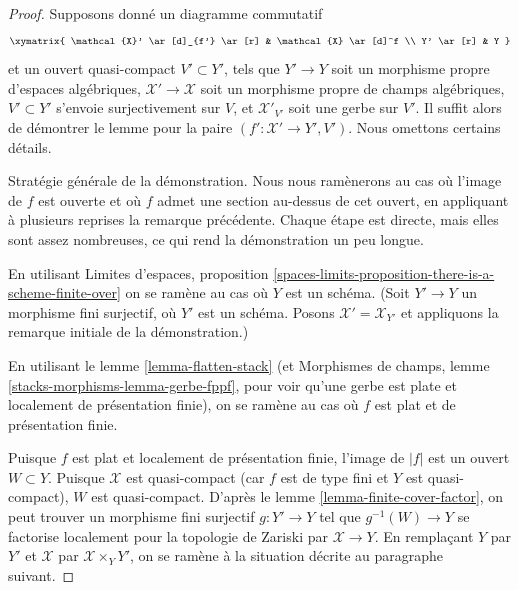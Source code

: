 \begin{proof}
Supposons donné un diagramme commutatif
$$
\xymatrix{
\mathcal{X}' \ar[d]_{f'} \ar[r] & \mathcal{X} \ar[d]^f \\
Y' \ar[r] & Y
}
$$
et un ouvert quasi-compact $V' \subset Y'$, tels que
$Y' \to Y$ soit un morphisme propre d'espaces algébriques,
$\mathcal{X}' \to \mathcal{X}$ soit un morphisme propre de champs algébriques,
$V' \subset Y'$ s'envoie surjectivement sur $V$, et
$\mathcal{X}'_{V'}$ soit une gerbe sur $V'$.
Il suffit alors de démontrer le lemme pour la paire
$(f' : \mathcal{X}' \to Y', V')$. Nous omettons certains détails.

\medskip\noindent
Stratégie générale de la démonstration. Nous nous ramènerons
au cas où l'image de $f$ est ouverte et où $f$
admet une section au-dessus de cet ouvert, en appliquant à plusieurs reprises
la remarque précédente. Chaque étape est directe, mais elles sont
assez nombreuses, ce qui rend la démonstration un peu longue.

\medskip\noindent
En utilisant Limites d'espaces, proposition
\ref{spaces-limits-proposition-there-is-a-scheme-finite-over}
on se ramène au cas où $Y$ est un schéma.
(Soit $Y' \to Y$ un morphisme fini surjectif, où $Y'$ est
un schéma. Posons $\mathcal{X}' = \mathcal{X}_{Y'}$ et appliquons
la remarque initiale de la démonstration.)

\medskip\noindent
En utilisant le lemme \ref{lemma-flatten-stack}
(et Morphismes de champs, lemme \ref{stacks-morphisms-lemma-gerbe-fppf},
pour voir qu'une gerbe est plate et localement de présentation finie),
on se ramène au cas où $f$ est plat et de présentation finie.

\medskip\noindent
Puisque $f$ est plat et localement de
présentation finie, l'image de $|f|$ est un ouvert $W \subset Y$.
Puisque $\mathcal{X}$ est quasi-compact (car $f$ est de type fini
et $Y$ est quasi-compact), $W$ est quasi-compact.
D'après le lemme \ref{lemma-finite-cover-factor},
on peut trouver un morphisme fini surjectif $g : Y' \to Y$
tel que $g^{-1}(W) \to Y$ se factorise localement pour la topologie de Zariski
par $\mathcal{X} \to Y$.
En remplaçant $Y$ par $Y'$ et $\mathcal{X}$ par
$\mathcal{X} \times_Y Y'$, on se ramène à la situation
décrite au paragraphe suivant.


\end{proof}
